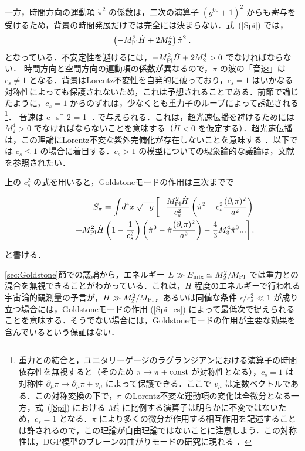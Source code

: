 一方，時間方向の運動項 $\dot{\pi}^2$ の係数は，二次の演算子 $(g^{00}+1)^2$ からも寄与を受けるため，背景の時間発展だけでは完全には決まらない．式~(\ref{Spi}) では，
\begin{equation}
\left(-M_{\rm Pl}^2 \dot{H} + 2 M_2^4 \right) \dot\pi^2 \;.
\end{equation}
となっている．不安定性を避けるには，$-M_{\rm Pl}^2 \dot{H} + 2 M_2^4 >0$ でなければならない．
時間方向と空間方向の運動項の係数が異なるので，$\pi$ の波の「音速」は $c_s \neq 1$ となる．背景はLorentz不変性を自発的に破っており，$c_s=1$ はいかなる対称性によっても保護されないため，これは予想されることである．前節で論じたように，$c_s=1$ からのずれは，少なくとも重力子のループによって誘起される\footnote{重力との結合と，ユニタリーゲージのラグランジアンにおける演算子の時間依存性を無視すると（そのため $\pi \to \pi + {\rm const}$ が対称性となる），$c_s=1$ は対称性 $\partial_\mu\pi \to
\partial_\mu\pi + v_\mu$ によって保護できる．ここで $v_\mu$ は定数ベクトルである．この対称変換の下で，$\pi$ のLorentz不変な運動項の変化は全微分となる一方，式~(\ref{Spi}) における $M_2^4$ に比例する演算子は明らかに不変ではないため，$c_s=1$ となる．$\pi$ により多くの微分が作用する相互作用を記述することは許されるので，この理論が自由理論ではないことに注意しよう．この対称性は，DGP模型のブレーンの曲がりモードの研究に現れる \cite{Adams:2006sv}．}．
音速は
\be
c_s^{-2} = 1- \;.
\ee
で与えられる．これは，超光速伝播を避けるためには $M_2^4 >0$ でなければならないことを意味する（$\dot H <0$ を仮定する）．超光速伝播は，この理論にLorentz不変な紫外完備化が存在しないことを意味する \cite{Adams:2006sv}．以下では $c_s \leq 1$ の場合に着目する．$c_s > 1$ の模型についての現象論的な議論は，文献 \cite{Mukhanov:2005bu} を参照されたい．

上の $c_s^2$ の式を用いると，Goldstoneモードの作用は三次までで

\begin{eqnarray}\label{Spi_cs}
&&S_{\rm \pi} = \int \!  d^4 x  \:  \sqrt{- g} \left[
-\frac{M^2_{\rm Pl} \dot{H}}{c^2_s} \left(\dot\pi^2-c^2_s
\frac{(\partial_i\pi)^2}{a^2}\right)
\right.\nonumber \\ &&\qquad\left.+M_{\rm Pl}^2 \dot H \left(1-\frac{1}{c^2_s}\right)
\left(\dot{\pi}^3-\dot\pi\frac{(\partial_i\pi)^2}{a^2}
\right)- \frac43 M_3^4 \dot\pi^3... \right].
\end{eqnarray}

と書ける．

\ref{sec:Goldstone}節での議論から，エネルギー $E \gg E_{\rm mix}
\simeq M_2^2/M_{\rm Pl}$ では重力との混合を無視できることがわかっている．これは，$H$ 程度のエネルギーで行われる宇宙論的観測量の予言が，$H \gg M_2^2/M_{\rm Pl}$，あるいは同値な条件 $\epsilon/c_s^2 \ll 1$ が成り立つ場合には，Goldstoneモードの作用 (\ref{Spi_cs}) によって最低次で捉えられることを意味する．そうでない場合には，Goldstoneモードの作用が主要な効果を含んでいるという保証はない．

